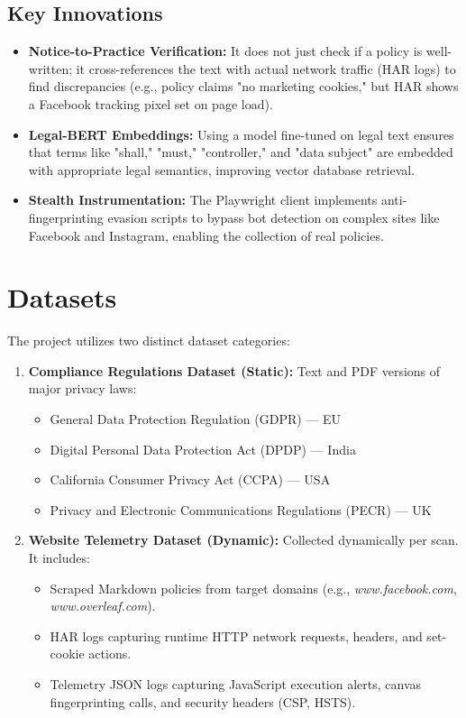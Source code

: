 \documentclass[11pt,a4paper]{article}
\begin{document}
\subsection{Key Innovations}
\begin{itemize}
    \item \textbf{Notice-to-Practice Verification:} It does not just check if a policy is well-written; it cross-references the text with actual network traffic (HAR logs) to find discrepancies (e.g., policy claims "no marketing cookies," but HAR shows a Facebook tracking pixel set on page load).
    \item \textbf{Legal-BERT Embeddings:} Using a model fine-tuned on legal text ensures that terms like "shall," "must," "controller," and "data subject" are embedded with appropriate legal semantics, improving vector database retrieval.
    \item \textbf{Stealth Instrumentation:} The Playwright client implements anti-fingerprinting evasion scripts to bypass bot detection on complex sites like Facebook and Instagram, enabling the collection of real policies.
\end{itemize}

\section{Datasets}
The project utilizes two distinct dataset categories:
\begin{enumerate}
    \item \textbf{Compliance Regulations Dataset (Static):} Text and PDF versions of major privacy laws:
    \begin{itemize}
        \item General Data Protection Regulation (GDPR) --- EU
        \item Digital Personal Data Protection Act (DPDP) --- India
        \item California Consumer Privacy Act (CCPA) --- USA
        \item Privacy and Electronic Communications Regulations (PECR) --- UK
    \end{itemize}
    \item \textbf{Website Telemetry Dataset (Dynamic):} Collected dynamically per scan. It includes:
    \begin{itemize}
        \item Scraped Markdown policies from target domains (e.g., \textsl{www.facebook.com}, \textsl{www.overleaf.com}).
        \item HAR logs capturing runtime HTTP network requests, headers, and set-cookie actions.
        \item Telemetry JSON logs capturing JavaScript execution alerts, canvas fingerprinting calls, and security headers (CSP, HSTS).
    \end{itemize}
\end{enumerate}
\end{document}
